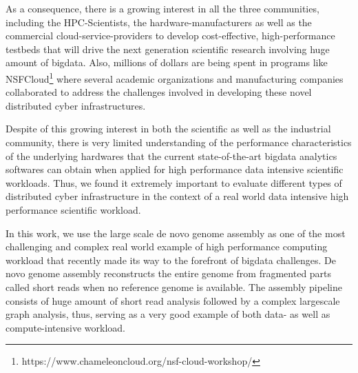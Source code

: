 \documentclass[conference]{IEEEtran}
\begin{document}
As a consequence, there is a growing interest in all the three communities, including the HPC-Scientists, the hardware-manufacturers as well as the commercial cloud-service-providers to develop cost-effective, high-performance testbeds that will drive the next generation scientific research involving huge amount of bigdata.
Also, millions of dollars are being spent in programs like NSFCloud\footnote{https://www.chameleoncloud.org/nsf-cloud-workshop/} where several academic organizations and manufacturing companies collaborated to address the challenges involved in developing these novel distributed cyber infrastructures.

Despite of this growing interest in both the scientific as well as the industrial community, there is very limited understanding of the performance characteristics of the underlying hardwares that the current state-of-the-art bigdata analytics softwares can obtain when applied for high performance data intensive scientific workloads.
Thus, we found it extremely important to evaluate different types of distributed cyber infrastructure in the context of a real world data intensive high performance scientific workload.  

In this work, we use the large scale de novo genome assembly as one of the most challenging and complex real world example of high performance computing workload that recently made its way to the forefront of bigdata challenges.
De novo genome assembly reconstructs the entire genome from fragmented parts called short reads when no reference genome is available.
The assembly pipeline consists of huge amount of short read analysis followed by a  complex largescale graph analysis, thus, serving as a very good example of both data- as well as compute-intensive workload.
\end{document}
